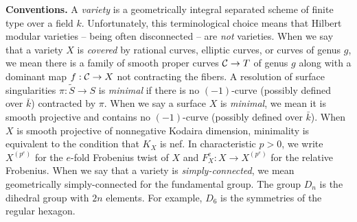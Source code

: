 \documentclass[main.tex]{subfiles}
\begin{document}
\textbf{Conventions.} A \textit{variety} is a geometrically integral separated scheme of finite type over a field $k$. Unfortunately, this terminological choice means that Hilbert modular varieties -- being often disconnected -- are \textit{not} varieties. When we say that a variety $X$ is \textit{covered} by rational curves, elliptic curves, or curves of genus $g$, we mean there is a family of smooth proper curves $\mathcal{C} \to T$ of genus $g$ along with a dominant map $f : \mathcal{C} \to X$ not contracting the fibers. A resolution of surface singularities $\pi : \tilde{S} \to S$ is \textit{minimal} if there is no $(-1)$-curve (possibly defined over $\bar{k}$) contracted by $\pi$. When we say a surface $X$ is \textit{minimal}, we mean it is smooth projective and contains no $(-1)$-curve (possibly defined over $\bar{k}$). When $X$ is smooth projective of nonnegative Kodaira dimension, minimality is equivalent to the condition that $K_X$ is nef. In characteristic $p > 0$, we write $X^{(p^e)}$ for the $e$-fold Frobenius twist of $X$ and $F_X^e : X \to X^{(p^e)}$ for the relative Frobenius. When we say that a variety is \textit{simply-connected}, we mean geometrically simply-connected for the \etale fundamental group. The group $D_{n}$ is the dihedral group with $2n$ elements. For example, $D_{6}$ is the symmetries of the regular hexagon.

\ifSubfilesClassLoaded{%
  
  
}{}
\end{document}
